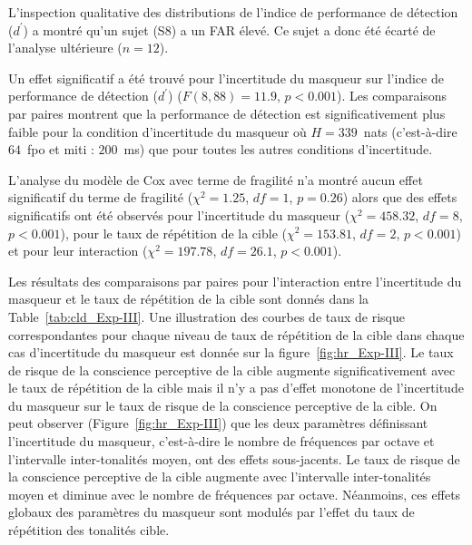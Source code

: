 L'inspection qualitative des distributions de l'indice de performance de détection ($d^\prime$) a montré qu'un sujet (S8) a un FAR élevé. 
Ce sujet a donc été écarté de l'analyse ultérieure ($n=12$).

Un effet significatif a été trouvé pour l'incertitude du masqueur sur l'indice de performance de détection ($d^\prime$) (${F(8,88)=11.9}$, ${p<0.001}$). 
Les comparaisons par paires montrent que la performance de détection est significativement plus faible pour la condition d'incertitude du masqueur où $H=339$~nats (c'est-à-dire $64$~fpo et miti : $200$~ms) que pour toutes les autres conditions d'incertitude.

L'analyse du modèle de Cox avec terme de fragilité n'a montré aucun effet significatif du terme de fragilité (${\chi^2=1.25}$, ${df=1}$, ${p=0.26}$) alors que des effets significatifs ont été observés pour l'incertitude du masqueur (${\chi^2=458.32}$, ${df=8}$, ${p<0.001}$), pour le taux de répétition de la cible (${\chi^2=153.81}$, ${df=2}$, ${p<0.001}$) et pour leur interaction (${\chi^2=197.78}$, ${df=26.1}$, ${p<0.001}$).  

Les résultats des comparaisons par paires pour l'interaction entre l'incertitude du masqueur et le taux de répétition de la cible sont donnés dans la Table~\ref{tab:cld_Exp-III}. 
Une illustration des courbes de taux de risque correspondantes pour chaque niveau de taux de répétition de la cible dans chaque cas d'incertitude du masqueur est donnée sur la figure~\ref{fig:hr_Exp-III}. 
Le taux de risque de la conscience perceptive de la cible augmente significativement avec le taux de répétition de la cible mais il n'y a pas d'effet monotone de l'incertitude du masqueur sur le taux de risque de la conscience perceptive de la cible. 
On peut observer (Figure~\ref{fig:hr_Exp-III}) que les deux paramètres définissant l'incertitude du masqueur, c'est-à-dire le nombre de fréquences par octave et l'intervalle inter-tonalités moyen, ont des effets sous-jacents. 
Le taux de risque de la conscience perceptive de la cible augmente avec l'intervalle inter-tonalités moyen et diminue avec le nombre de fréquences par octave. 
Néanmoins, ces effets globaux des paramètres du masqueur sont modulés par l'effet du taux de répétition des tonalités cible.

